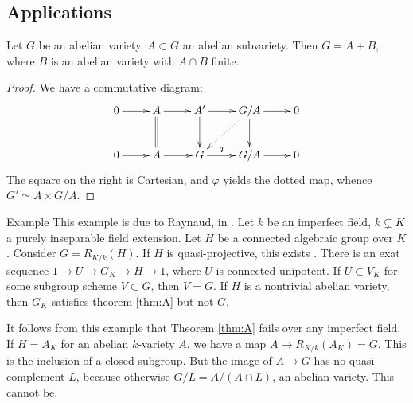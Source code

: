 \subsection{Applications}

\begin{coro}
Let $G$ be an abelian variety, $A\subset G$ an abelian subvariety. Then 
$G=A + B$, where $B$ is an abelian variety with $A\cap B$ finite. 
\end{coro}
\begin{proof}
We have a commutative diagram:
\[\xymatrix{
  0 \ar[r] 
    & A \ar[r] \ar@{=}[d] 
    & A' \ar[r] \ar[d] 
    & G/A \ar[r] \ar[d] \ar@{.>}[dl] 
    & 0 \\
  0 \ar[r] 
    & A \ar[r] 
    & G \ar[r]^-q 
    & G/A \ar[r] 
    & 0 
}\]
The square on the right is Cartesian, and $\varphi$ yields the dotted map, 
whence $G'\simeq A\times G/A$.   
\end{proof}

\begin{enonce}[remark]{Example}
This example is due to Raynaud, in \cite[XVIII.A3]{sga3}. Let $k$ be an 
imperfect field, $k\subsetneq K$ a purely inseparable field extension. Let 
$H$ be a connected algebraic group over $K$. Consider 
$G=R_{K/k}(H)$. If $H$ is quasi-projective, this exists \cite[A]{cgp10}. There 
is an exat sequence $1 \to U \to G_K\to H \to 1$, where $U$ is connected 
unipotent. If $U\subset V_K$ for some subgroup scheme $V\subset G$, then $V=G$. 
If $H$ is a nontrivial abelian variety, then $G_K$ satisfies theorem 
\ref{thm:A} but not $G$. 
\end{enonce}

It follows from this example that Theorem \ref{thm:A} fails over any 
imperfect field. If $H=A_K$ for an abelian $k$-variety $A$, we have a map 
$A\to R_{K/k}(A_K)=G$. This is the inclusion of a closed subgroup. But the 
image of $A\to G$ has no quasi-complement $L$, because otherwise 
$G/L=A/(A\cap L)$, an abelian variety. This cannot be. 

